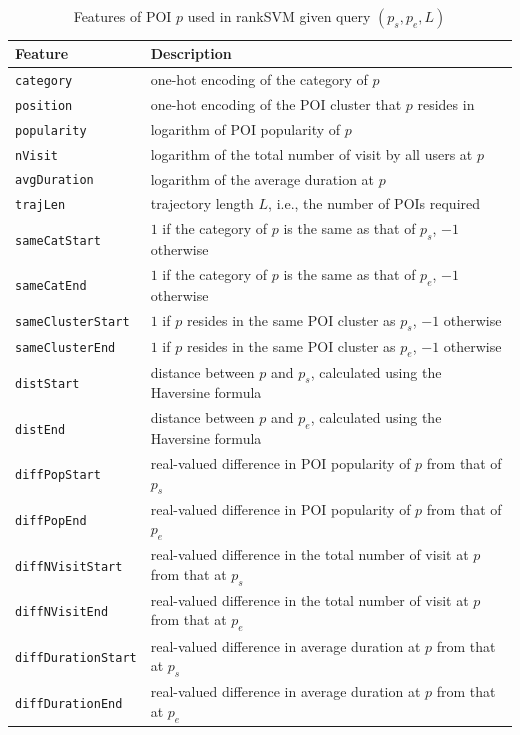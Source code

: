 \begin{table}[t]
\caption{Features of POI $p$ used in rankSVM given query $(p_s, p_e, L)$}
\label{tab:featurerank}
\centering
\begin{tabular}{l|l} \hline
\textbf{Feature}  & \textbf{Description} \\ \hline
\texttt{category}          & one-hot encoding of the category of $p$ \\
\texttt{position}          & one-hot encoding of the POI cluster that $p$ resides in \\
\texttt{popularity}        & logarithm of POI popularity of $p$ \\
\texttt{nVisit}            & logarithm of the total number of visit by all users at $p$ \\
\texttt{avgDuration}       & logarithm of the average duration at $p$ \\ \hline
\texttt{trajLen}           & trajectory length $L$, i.e., the number of POIs required \\
\texttt{sameCatStart}      & $1$ if the category of $p$ is the same as that of $p_s$, $-1$ otherwise \\
\texttt{sameCatEnd}        & $1$ if the category of $p$ is the same as that of $p_e$, $-1$ otherwise \\
\texttt{sameClusterStart}  & $1$ if $p$ resides in the same POI cluster as $p_s$, $-1$ otherwise \\
\texttt{sameClusterEnd}    & $1$ if $p$ resides in the same POI cluster as $p_e$, $-1$ otherwise \\
\texttt{distStart}         & distance between $p$ and $p_s$, calculated using the Haversine formula \\
\texttt{distEnd}           & distance between $p$ and $p_e$, calculated using the Haversine formula \\
\texttt{diffPopStart}      & real-valued difference in POI popularity of $p$ from that of $p_s$ \\
\texttt{diffPopEnd}        & real-valued difference in POI popularity of $p$ from that of $p_e$ \\
\texttt{diffNVisitStart}   & real-valued difference in the total number of visit at $p$ from that at $p_s$ \\
\texttt{diffNVisitEnd}     & real-valued difference in the total number of visit at $p$ from that at $p_e$ \\
\texttt{diffDurationStart} & real-valued difference in average duration at $p$ from that at $p_s$ \\
\texttt{diffDurationEnd}   & real-valued difference in average duration at $p$ from that at $p_e$ \\ \hline
\end{tabular}
\end{table}


